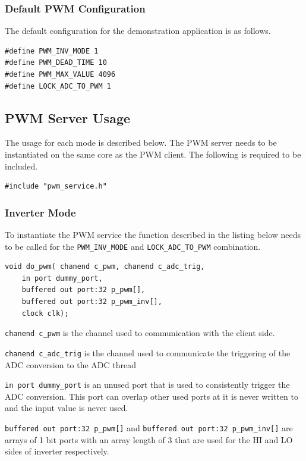 \subsubsection{Default PWM Configuration}
The default configuration for the demonstration application is as follows. 

\begin{lstlisting}
#define PWM_INV_MODE 1
#define PWM_DEAD_TIME 10
#define PWM_MAX_VALUE 4096
#define LOCK_ADC_TO_PWM 1
\end{lstlisting}

\subsection{PWM Server Usage}
The usage for each mode is described below. The PWM server needs to be instantiated on the same core as the PWM client. The following is required to be included.

\begin{lstlisting}
#include "pwm_service.h"
\end{lstlisting}

\subsubsection{Inverter Mode}
To instantiate the PWM service the function described in the listing below needs to be called for the \verb=PWM_INV_MODE= and \verb=LOCK_ADC_TO_PWM= combination.

\begin{lstlisting}
void do_pwm( chanend c_pwm, chanend c_adc_trig, 
	in port dummy_port, 
	buffered out port:32 p_pwm[],  
	buffered out port:32 p_pwm_inv[], 
	clock clk);
\end{lstlisting}

\verb=chanend c_pwm= is the channel used to communication with the client side.

\verb=chanend c_adc_trig= is the channel used to communicate the triggering of the ADC conversion to the ADC thread

\verb=in port dummy_port= is an unused port that is used to consistently trigger the ADC conversion. This port can overlap other used ports at it is never written to and the input value is never used.

\verb=buffered out port:32 p_pwm[]= and \verb=buffered out port:32 p_pwm_inv[]= are arrays of 1 bit ports with an array length of 3 that are used for the HI and LO sides of inverter respectively.


